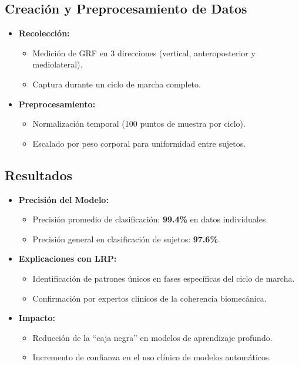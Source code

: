 \documentclass{report}
\begin{document}
\subsection{Creación y Preprocesamiento de Datos}
\begin{itemize}
    \item \textbf{Recolección:}
    \begin{itemize}
        \item Medición de GRF en 3 direcciones (vertical, anteroposterior y mediolateral).
        \item Captura durante un ciclo de marcha completo.
    \end{itemize}
    \item \textbf{Preprocesamiento:}
    \begin{itemize}
        \item Normalización temporal (100 puntos de muestra por ciclo).
        \item Escalado por peso corporal para uniformidad entre sujetos.
    \end{itemize}
\end{itemize}

\subsection{Resultados}
\begin{itemize}
    \item \textbf{Precisión del Modelo:}
    \begin{itemize}
        \item Precisión promedio de clasificación: \textbf{99.4\%} en datos individuales.
        \item Precisión general en clasificación de sujetos: \textbf{97.6\%}.
    \end{itemize}
    \item \textbf{Explicaciones con LRP:}
    \begin{itemize}
        \item Identificación de patrones únicos en fases específicas del ciclo de marcha.
        \item Confirmación por expertos clínicos de la coherencia biomecánica.
    \end{itemize}
    \item \textbf{Impacto:}
    \begin{itemize}
        \item Reducción de la “caja negra” en modelos de aprendizaje profundo.
        \item Incremento de confianza en el uso clínico de modelos automáticos.
    \end{itemize}
\end{itemize}
\end{document}
